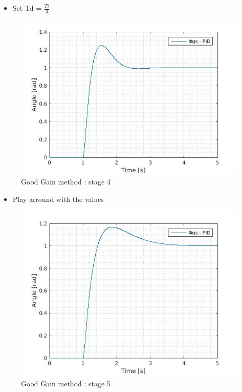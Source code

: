     
\begin{itemize}
  \item Set Td = $\frac{Ti}{4}$
\end{itemize}
  
  \begin{figure}[H]
    \centering
    \includegraphics[scale=0.4]{figures/GG4.jpg}
    \caption[LABEL] {Good Gain method : stage 4} 
  \end{figure}
    
    
\begin{itemize}
  \item Play arround with the values
\end{itemize}
  
  \begin{figure}[H]
    \centering
    \includegraphics[scale=0.4]{figures/GG5.jpg}
    \caption[LABEL] {Good Gain method : stage 5} 
  \end{figure}